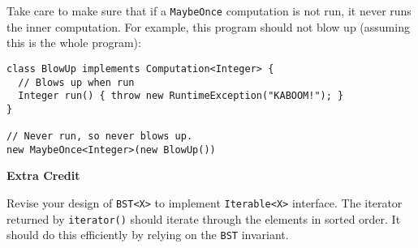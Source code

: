 \documentclass[12pt]{article}                   %
\def\pts#1{\marginpar{\footnotesize \raggedright  \fbox{#1 {\sc Points}}}}
\begin{document}
\begin{problem}
\begin{enumerate}
Take care to make sure that if a \texttt{MaybeOnce} computation is not
run, it never runs the inner computation.  For example, 
this program should not blow up (assuming this is the whole program):

\begin{verbatim}
class BlowUp implements Computation<Integer> {
  // Blows up when run
  Integer run() { throw new RuntimeException("KABOOM!"); }
}

// Never run, so never blows up.
new MaybeOnce<Integer>(new BlowUp())
\end{verbatim}
\end{enumerate}

\ifrubric
\else
{}
\fi
\newpage
\newpage

\end{problem}

\ifrubric
\else
{}
\fi
\newpage

\begin{problem}  \pts{5}

{\bf Extra Credit}

\noindent
Revise your design of \texttt{BST<X>} to implement
 \texttt{Iterable<X>} interface.  The iterator returned by
 \texttt{iterator()} should iterate through the elements in sorted order.
 It should do this efficiently by relying on the \texttt{BST} invariant.



\end{problem}

\end{document}
